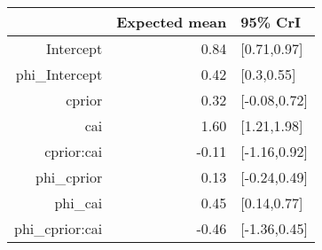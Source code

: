 \begin{tabular}{rrl}
  \hline
 & Expected mean & 95\% CrI \\ 
  \hline
Intercept & 0.84 & [0.71,0.97] \\ 
  phi\_Intercept & 0.42 & [0.3,0.55] \\ 
  cprior & 0.32 & [-0.08,0.72] \\ 
  cai & 1.60 & [1.21,1.98] \\ 
  cprior:cai & -0.11 & [-1.16,0.92] \\ 
  phi\_cprior & 0.13 & [-0.24,0.49] \\ 
  phi\_cai & 0.45 & [0.14,0.77] \\ 
  phi\_cprior:cai & -0.46 & [-1.36,0.45] \\ 
   \hline
\end{tabular}

